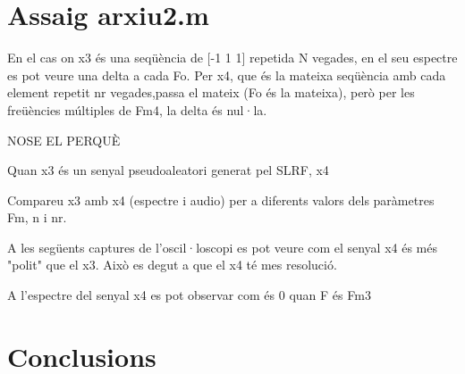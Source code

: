 \documentclass[11pt]{report}
\begin{document}
\section*{Assaig arxiu2.m}

En el cas on x3 és una seqüència de [-1 1 1] repetida N vegades, en el seu espectre es pot veure una delta a cada Fo.
Per x4, que és la mateixa seqüència amb cada element repetit nr vegades,passa el mateix (Fo és la mateixa), però per les freüències múltiples de Fm4, la delta és nul·la.




NOSE EL PERQUÈ

Quan x3 és un senyal pseudoaleatori generat pel SLRF, x4 



Compareu x3 amb x4 (espectre i audio) per a diferents valors dels paràmetres Fm, n i nr.


A les següents captures de l'oscil·loscopi es pot veure com el senyal x4 és més "polit" que el x3. Això es degut a que el x4 té mes resolució.

A l'espectre del senyal x4 es pot observar com és 0 quan F és Fm3
\section{Conclusions}
\end{document}
